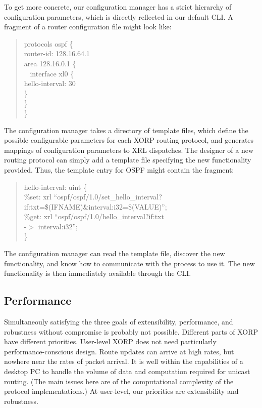 To get more concrete, our configuration manager has a strict hierarchy
of configuration parameters, which is directly reflected in our
default CLI.  A fragment of a router configuration file might look
like:

\begin{quotation}
\noindent \sf \small protocols ospf \{\\
\parindent 10pt 
\indent     router-id: 128.16.64.1\\
\indent     area 128.16.0.1 \{\\\
\parindent 20pt 
\indent       interface xl0 \{\\
\parindent 30pt 
\indent         hello-interval: 30\\
\parindent 20pt 
\indent       \}\\
\parindent 10pt 
\indent     \}\\
\}
\end{quotation}

The configuration manager takes a directory of template files, which
define the possible configurable parameters for each XORP routing
protocol, and generates mappings of configuration parameters to XRL
dispatches.  The designer of a new routing protocol can simply add a
template file specifying the new functionality provided.  Thus, the
template entry for OSPF might contain the fragment:

\begin{quotation}
\noindent \sf \small hello-interval: uint \{ \\
\parindent 10pt 
\indent \%set: xrl ``ospf/ospf/1.0/set\_hello\_interval?\\
\parindent 60pt 
\indent if:txt=\$(IFNAME)\&interval:i32=\$(VALUE)'';\\
\parindent 10pt 
\indent \%get: xrl ``ospf/ospf/1.0/hello\_interval?if:txt\\
\parindent 60pt 
\indent -$>$ interval:i32'';\\
\}
\end{quotation}

The configuration manager can read the template file, discover the new
functionality, and know how to communicate with the process to use it.
The new functionality is then immediately available through the CLI.

\subsection{Performance}

Simultaneouly satisfying the three goals of extensibility,
performance, and robustness without compromise is probably not
possible. Different parts of XORP have different priorities.
User-level XORP does not need particularly performance-conscious
design.  Route updates can arrive at high rates, but nowhere near the
rates of packet arrival.  It is well within the capabilities of a
desktop PC to handle the volume of data and computation required for
unicast routing. (The main issues here are of the computational
complexity of the protocol implementations.)  At user-level, our
priorities are extensibility and robustness.

